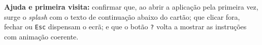     \item \textbf{Ajuda e primeira visita:} confirmar que, ao abrir a aplicação pela
    primeira vez, surge o \textit{splash} com o texto de continuação abaixo do cartão;
    que clicar fora, fechar ou \texttt{Esc} dispensam o ecrã; e que o botão
    \texttt{?} volta a mostrar as instruções com animação coerente.





